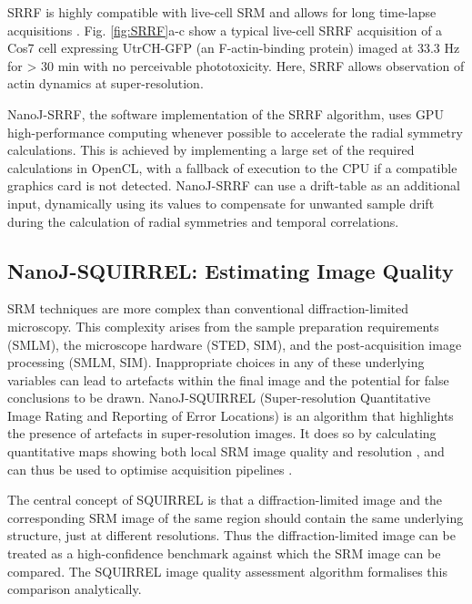  SRRF is highly compatible with live-cell SRM and allows for long time-lapse acquisitions \cite{culley2018srrf}. Fig. \ref{fig:SRRF}a-c show a typical live-cell SRRF acquisition of a Cos7 cell expressing UtrCH-GFP (an F-actin-binding protein) imaged at 33.3 Hz for > 30 min with no perceivable phototoxicity. Here, SRRF allows observation of actin dynamics at super-resolution.
 
 NanoJ-SRRF, the software implementation of the SRRF algorithm, uses GPU high-performance computing whenever possible to accelerate the radial symmetry calculations. This is achieved by implementing a large set of the required calculations in OpenCL, with a fallback of execution to the CPU if a compatible graphics card is not detected. NanoJ-SRRF can use a drift-table as an additional input, dynamically using its values to compensate for unwanted sample drift during the calculation of radial symmetries and temporal correlations.

\subsection*{NanoJ-SQUIRREL: Estimating Image Quality}
SRM techniques are more complex than conventional diffraction-limited microscopy. This complexity arises from the sample preparation requirements (SMLM), the microscope hardware (STED, SIM), and the post-acquisition image processing (SMLM, SIM). Inappropriate choices in any of these underlying variables can lead to artefacts within the final image and the potential for false conclusions to be drawn. NanoJ-SQUIRREL (Super-resolution Quantitative Image Rating and Reporting of Error Locations) is an algorithm that highlights the presence of artefacts in super-resolution images. It does so by calculating quantitative maps showing both local SRM image quality and resolution \cite{culley2018quantitative}, and can thus be used to optimise acquisition pipelines \cite{culley2018srrf}.

 The central concept of SQUIRREL is that a diffraction-limited image and the corresponding SRM image of the same region should contain the same underlying structure, just at different resolutions. Thus the diffraction-limited image can be treated as a high-confidence benchmark against which the SRM image can be compared. The SQUIRREL image quality assessment algorithm formalises this comparison analytically.

